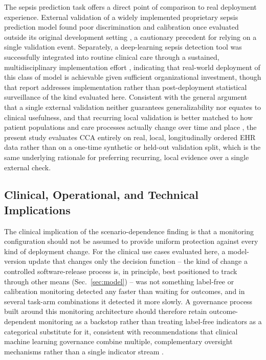 \documentclass[preprintsapa,article,submit,oneauthor]{Definitions/mdpi}
\begin{document}
The sepsis prediction task offers a direct point of comparison to real deployment experience. External validation of a widely implemented proprietary sepsis prediction model found poor discrimination and calibration once evaluated outside its original development setting \citep{wong2021}, a cautionary precedent for relying on a single validation event. Separately, a deep-learning sepsis detection tool was successfully integrated into routine clinical care through a sustained, multidisciplinary implementation effort \citep{sendak2020}, indicating that real-world deployment of this class of model is achievable given sufficient organizational investment, though that report addresses implementation rather than post-deployment statistical surveillance of the kind evaluated here. Consistent with the general argument that a single external validation neither guarantees generalizability nor equates to clinical usefulness, and that recurring local validation is better matched to how patient populations and care processes actually change over time and place \citep{youssef2023}, the present study evaluates CCA entirely on real, local, longitudinally ordered EHR data rather than on a one-time synthetic or held-out validation split, which is the same underlying rationale for preferring recurring, local evidence over a single external check.

\subsection{Clinical, Operational, and Technical Implications}\label{sec:disc-implications}

The clinical implication of the scenario-dependence finding is that a monitoring configuration should not be assumed to provide uniform protection against every kind of deployment change. For the clinical use cases evaluated here, a model-version update that changes only the decision function -- the kind of change a controlled software-release process is, in principle, best positioned to track through other means (Sec.~\ref{sec:model}) -- was not something label-free or calibration monitoring detected any faster than waiting for outcomes, and in several task-arm combinations it detected it more slowly. A governance process built around this monitoring architecture should therefore retain outcome-dependent monitoring as a backstop rather than treating label-free indicators as a categorical substitute for it, consistent with recommendations that clinical machine learning governance combine multiple, complementary oversight mechanisms rather than a single indicator stream \citep{finlayson2021,nist2023}.
\end{document}
